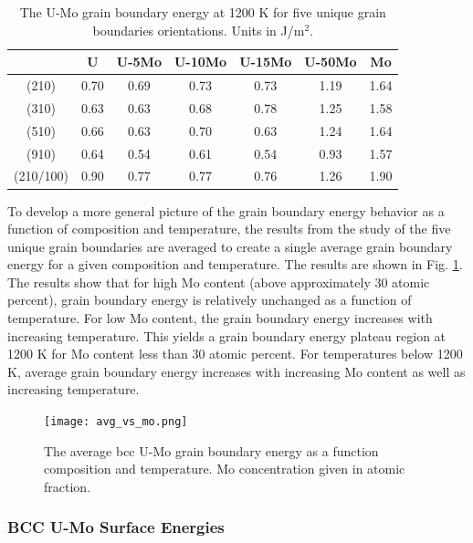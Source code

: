 \documentclass[review]{elsarticle}
\begin{document}
\begin{table}[h]
\caption{The U-Mo grain boundary energy at 1200 K for five unique grain boundaries orientations. Units in J/m$^{2}$. } \label{tab:umo1200}
\begin{center}
\begin{tabular}{|c|c|c|c|c|c|c|}
	\hline
 & U & U-5Mo & U-10Mo & U-15Mo & U-50Mo & Mo \\
\hline
(210)	 & 0.70 & 0.69 & 0.73 & 0.73 & 1.19 & 1.64 \\
(310)	 & 0.63 & 0.63 & 0.68 & 0.78 & 1.25 & 1.58 \\
(510)	 & 0.66 & 0.63 & 0.70 & 0.63 & 1.24 & 1.64 \\
(910)	 & 0.64 & 0.54 & 0.61 & 0.54 & 0.93 & 1.57 \\
(210/100) & 0.90 & 0.77 & 0.77 & 0.76 & 1.26 & 1.90 \\
 	 \hline
\end{tabular}
\end{center}
\label{default}
\end{table}

\FloatBarrier

To develop a more general picture of the grain boundary energy behavior as a function of composition and temperature, the results from the study of the five unique grain boundaries are averaged to create a single average grain boundary energy for a given composition and temperature. The results are shown in Fig. \ref{fig:avgvsmo}. The results show that for high Mo content (above approximately 30 atomic percent), grain boundary energy is relatively unchanged as a function of temperature. For low Mo content, the grain boundary energy increases with increasing temperature. This yields a grain boundary energy plateau region at 1200 K for Mo content less than 30 atomic percent. For temperatures below 1200 K, average grain boundary energy increases with increasing Mo content as well as increasing temperature. 

\begin{figure}[h]
 \centering
 \texttt{[image: avg\_vs\_mo.png]} 
 \caption{The average bcc U-Mo grain boundary energy as a function composition and temperature. Mo concentration given in atomic fraction.}
 \label{fig:avgvsmo}
\end{figure}

\FloatBarrier

 
\subsubsection{BCC U-Mo Surface Energies}
\end{document}

